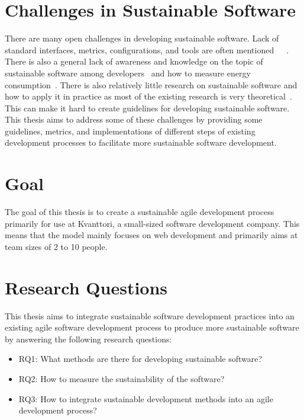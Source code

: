 \section{Challenges in Sustainable Software}\label{challenges}
There are many open challenges in developing sustainable software. Lack of standard interfaces, metrics, configurations, and tools are often mentioned~\cite{Challenges}~\cite{empiricalstudyonpracticioners}~\cite{miningquestions}. There is also a general lack of awareness and knowledge on the topic of sustainable software among developers~\cite{softwareindustryawarness} and how to measure energy consumption~\cite{energyefficiencyanewconcern}. There is also relatively little research on sustainable software and how to apply it in practice as most of the existing research is very theoretical~\cite{Nurmivaara2023}. This can make it hard to create guidelines for developing sustainable software. This thesis aims to address some of these challenges by providing some guidelines, metrics, and implementations of different steps of existing development processes to facilitate more sustainable software development.

\section{Goal}
The goal of this thesis is to create a sustainable agile development process primarily for use at Kvanttori, a small-sized software development company. This means that the model mainly focuses on web development and primarily aims at team sizes of 2 to 10 people.

\section{Research Questions}
This thesis aims to integrate sustainable software development practices into an existing agile software development process to produce more sustainable software by answering the following research questions:
\begin{itemize}
    \item RQ1: What methods are there for developing sustainable software?
    \item RQ2: How to measure the sustainability of the software?
    \item RQ3: How to integrate sustainable development methods into an agile development process?
\end{itemize}


